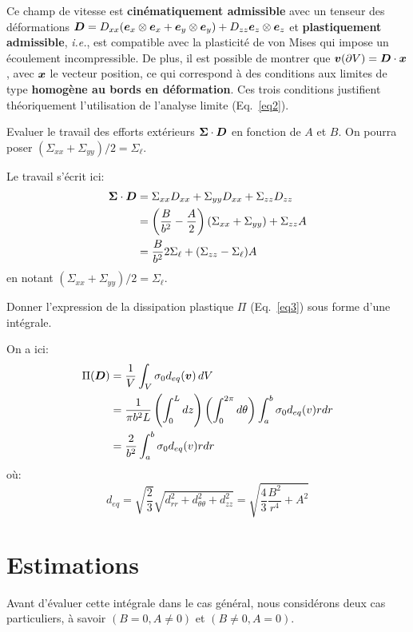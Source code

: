 \documentclass[french,english,12pt]{exam}
\begin{document}
\begin{questions}
Ce champ de vitesse est \textbf{cinématiquement admissible} avec un tenseur des déformations $\boldsymbol{D} = D_{xx} (\boldsymbol{e}_x \otimes \boldsymbol{e}_x + \boldsymbol{e}_y \otimes \boldsymbol{e}_y) + D_{zz} \boldsymbol{e}_z \otimes \boldsymbol{e}_z $ et \textbf{plastiquement admissible}, \textit{i.e.}, est compatible avec la plasticité de von Mises qui impose un écoulement incompressible. De plus, il est possible de montrer que $\boldsymbol{v}(\partial V) = \boldsymbol{D} \cdot \boldsymbol{x}$, avec $\boldsymbol{x}$ le vecteur position, ce qui correspond à des conditions aux limites de type \textbf{homogène au bords en déformation}. Ces trois conditions justifient théoriquement l'utilisation de l'analyse limite (Eq.~\ref{eq2}). %


\question Evaluer le travail des efforts extérieurs $\boldsymbol{\Sigma} \cdot \boldsymbol{D}$ en fonction de $A$ et $B$. On pourra poser $(\Sigma_{xx}+\Sigma_{yy})/2= \Sigma_\ell$.
\begin{solution}
Le travail s'écrit ici:
\begin{eqnarray*}
\boldsymbol{\Sigma} \cdot \boldsymbol{D} &= \Sigma_{xx}D_{xx}+\Sigma_{yy}D_{xx}+\Sigma_{zz}D_{zz}\\
&= \left(\dfrac{B}{b^2}- \dfrac{A}{2}\right)(\Sigma_{xx}+\Sigma_{yy})+\Sigma_{zz}A \\
&= \dfrac{B}{b^2}2\Sigma_\ell + (\Sigma_{zz}-\Sigma_\ell)A
\end{eqnarray*} en notant $(\Sigma_{xx}+\Sigma_{yy})/2= \Sigma_\ell$.
\end{solution}

\question Donner l'expression de la dissipation plastique $\Pi$ (Eq.~\ref{eq3}) sous forme d'une intégrale.
\begin{solution}
On a ici:
\begin{align*}\Pi(\boldsymbol{D}) &= \frac{1}{V} \int_V \sigma_0 d_{eq}(\boldsymbol{v}) \,dV \\
&= \frac{1}{\pi b^2 L} \left(\int_0^L dz\right)\left(\int_0^{2\pi} d\theta\right)\int_a^b \sigma_0 d_{eq}(v) rdr\\
&= \frac{2}{b^2} \int_a^b \sigma_0 d_{eq}(v) rdr
\end{align*}
où:
$$d_{eq} = \sqrt{\dfrac{2}{3}}\sqrt{d_{rr}^2+d_{\theta\theta}^2+d_{zz}^2} = \sqrt{\dfrac{4}{3}\dfrac{B^2}{r^4}+A^2}$$
\end{solution}

\section{Estimations}
Avant d'évaluer cette intégrale dans le cas général, nous considérons deux cas particuliers, à savoir $(B = 0, A \neq 0)$ et  $(B \neq 0, A = 0)$.\\


\end{questions}
\end{document}
